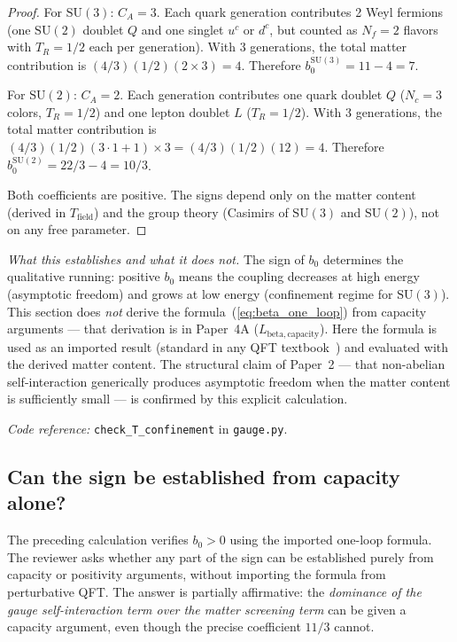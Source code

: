 \documentclass[11pt,a4paper]{article}
\theoremstyle{definition}
\newcommand{\SU}{\mathrm{SU}}
\newcommand{\coderef}[2]{\smallskip\noindent\textit{Code reference:} \texttt{#1} in \texttt{#2}.}
\begin{document}
\begin{proof}
For $\SU(3)$: $C_A = 3$.  Each quark generation contributes 2 Weyl
fermions (one $\SU(2)$ doublet $Q$ and one singlet $u^c$ or $d^c$,
but counted as $N_f = 2$ flavors with $T_R = 1/2$ each per generation).
With 3 generations, the total matter contribution is
$(4/3)(1/2)(2 \times 3) = 4$.  Therefore $b_0^{\SU(3)} = 11 - 4 = 7$.

For $\SU(2)$: $C_A = 2$.  Each generation contributes one quark doublet
$Q$ ($N_c = 3$ colors, $T_R = 1/2$) and one lepton doublet $L$
($T_R = 1/2$).  With 3 generations, the total matter contribution is
$(4/3)(1/2)(3 \cdot 1 + 1) \times 3 = (4/3)(1/2)(12) = 4$.
Therefore $b_0^{\SU(2)} = 22/3 - 4 = 10/3$.

Both coefficients are positive.  The signs depend only on the matter
content (derived in $T_{\mathrm{field}}$) and the group theory
(Casimirs of $\SU(3)$ and $\SU(2)$), not on any free parameter.
\end{proof}

\noindent\textit{What this establishes and what it does not.}\quad
The sign of $b_0$ determines the qualitative running: positive $b_0$
means the coupling decreases at high energy (asymptotic freedom) and
grows at low energy (confinement regime for $\SU(3)$).  This section
does \emph{not} derive the formula~(\ref{eq:beta_one_loop}) from
capacity arguments --- that derivation is in Paper~4A
($L_{\mathrm{beta,capacity}}$).  Here the formula is used as an
imported result (standard in any QFT textbook~\cite{PeskinSchroeder1995})
and evaluated with the derived matter content.  The structural claim
of Paper~2 --- that non-abelian self-interaction generically produces
asymptotic freedom when the matter content is sufficiently small ---
is confirmed by this explicit calculation.

\coderef{check\_T\_confinement}{gauge.py}


\subsection{Can the sign be established from capacity alone?}
\label{sec:AF_from_capacity}

The preceding calculation verifies $b_0 > 0$ using the imported
one-loop formula.  The reviewer asks whether any part of the sign can
be established purely from capacity or positivity arguments, without
importing the formula from perturbative QFT.  The answer is partially
affirmative: the \emph{dominance of the gauge self-interaction term
over the matter screening term} can be given a capacity argument,
even though the precise coefficient $11/3$ cannot.
\end{document}
